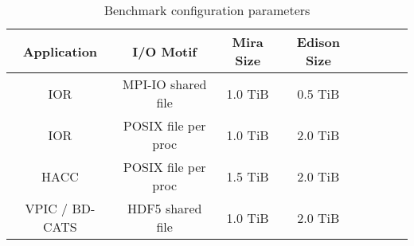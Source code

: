 \begin{table}[h]
\footnotesize
\centering
\caption{Benchmark configuration parameters}
\label{tab:bench-config}
\begin{tabular}{|c|c|c|c|c|c|c|c|}
\hline
Application & \textbf{I/O Motif} & \textbf{Mira Size} & \textbf{Edison Size} \\
\hline
IOR & MPI-IO shared file & 1.0 TiB & 0.5 TiB\\
\hline
IOR & POSIX file per proc & 1.0 TiB & 2.0 TiB\\
\hline
HACC & POSIX file per proc & 1.5 TiB & 2.0 TiB \\
\hline
VPIC / BD-CATS & HDF5 shared file & 1.0 TiB & 2.0 TiB\\
\hline
\end{tabular}
\normalsize
\vspace{-.4in}
\end{table}
